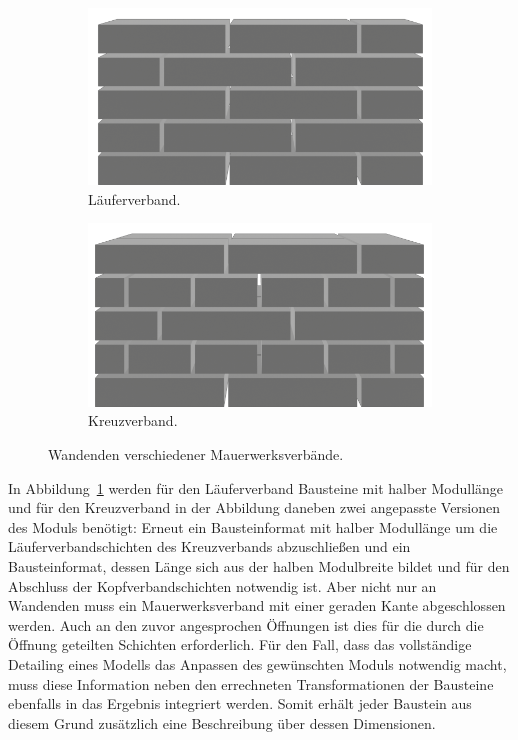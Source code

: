 \begin{figure}[htb]
    \begin{subfigure}[b]{0.5\columnwidth}
      \includegraphics[width=\columnwidth]{fig/concept_wall_endings_1.png}
      \caption{Läuferverband.}
      \label{fig:concept:lauferverband_ending}
    \end{subfigure}
    \hfill
    \begin{subfigure}[b]{0.5\columnwidth}
      \includegraphics[width=\columnwidth]{fig/concept_wall_endings_2.png}
      \caption{Kreuzverband.}
      \label{fig:concept:kreuzverband_ending}
    \end{subfigure}
  \caption{Wandenden verschiedener Mauerwerksverbände.}
\end{figure}

In Abbildung~\ref{fig:concept:lauferverband_ending} werden für den Läuferverband Bausteine mit halber Modullänge und für den Kreuzverband in der Abbildung daneben zwei angepasste Versionen des Moduls benötigt:
Erneut ein Bausteinformat mit halber Modullänge um die Läuferverbandschichten des Kreuzverbands abzuschließen und ein Bausteinformat, dessen Länge sich aus der halben Modulbreite bildet und für den Abschluss der Kopfverbandschichten notwendig ist.
Aber nicht nur an Wandenden muss ein Mauerwerksverband mit einer geraden Kante abgeschlossen werden.
Auch an den zuvor angesprochen Öffnungen ist dies für die durch die Öffnung geteilten Schichten erforderlich.
Für den Fall, dass das vollständige Detailing eines Modells das Anpassen des gewünschten Moduls notwendig macht, muss diese Information neben den errechneten Transformationen der Bausteine ebenfalls in das Ergebnis integriert werden.
Somit erhält jeder Baustein aus diesem Grund zusätzlich eine Beschreibung über dessen Dimensionen.

